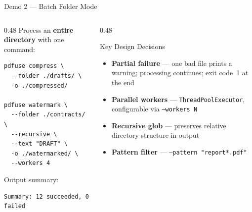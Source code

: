 \documentclass[aspectratio=169]{beamer}
\begin{document}
\begin{frame}[fragile]{Demo 2 --- Batch Folder Mode}
  \begin{columns}[T]
    \begin{column}{0.48\textwidth}
      Process an \textbf{entire directory} with one command:
      \begin{lstlisting}
pdfuse compress \
  --folder ./drafts/ \
  -o ./compressed/

pdfuse watermark \
  --folder ./contracts/ \
  --recursive \
  --text "DRAFT" \
  -o ./watermarked/ \
  --workers 4
      \end{lstlisting}
      \vspace{4pt}
      Output summary:
      \begin{lstlisting}
Summary: 12 succeeded, 0 failed
      \end{lstlisting}
    \end{column}
    \begin{column}{0.48\textwidth}
      \begin{block}{Key Design Decisions}
        \begin{itemize}
          \item \textbf{Partial failure} --- one bad file prints a
                warning; processing continues; exit code~1 at the end
          \vspace{3pt}
          \item \textbf{Parallel workers} ---
                \texttt{ThreadPoolExecutor}, configurable via
                \texttt{--workers N}
          \vspace{3pt}
          \item \textbf{Recursive glob} --- preserves relative
                directory structure in output
          \vspace{3pt}
          \item \textbf{Pattern filter} ---
                \texttt{--pattern "report*.pdf"}
        \end{itemize}
      \end{block}
    \end{column}
  \end{columns}
\end{frame}
\end{document}
